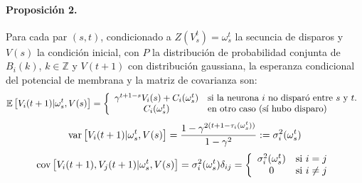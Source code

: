 \paragraph{Proposición 2.}
Para cada par $(s,t)$, condicionado a $Z(V_s^t)=\omega_s^t$ la secuncia de disparos y $V(s)$ la condición inicial, con $P$ la distribución de probabilidad conjunta de $B_i(k)$, $k \in \mathbb{Z}$ y $V(t+1)$ con distribución gaussiana, la esperanza condicional del potencial de membrana y la matriz de covarianza son:
\begin{equation}
    \mathbb{E} \left[V_i(t+1)|\omega_s^t, V(s)\right] = \left\{ \begin{array}{cl}
                        \gamma^{t+1-s} V_i(s) + C_i(\omega_s^t)   & \text{si la neurona $i$ no disparó entre $s$ y $t$.}\\ 
                         C_i(\omega_s^t)    & \text{en otro caso (sí hubo disparo)}
                    \end{array}\right.
    \label{eqn:espCond1}
\end{equation}
\begin{equation}
    \text{var}\left[V_i(t+1)|\omega_s^t, V(s)\right] = \frac{1-\gamma^{2(t+1-\tau_i(\omega_s^t))}}{1-\gamma^2} := \sigma_i^2(\omega_s^t)
    \label{eqn:varianzapot}
\end{equation}
\begin{equation}
    \text{cov}\left[V_i(t+1),V_j(t+1)|\omega_s^t, V(s)\right] = \sigma_i^2(\omega_s^t) \delta_{ij} = \left\{ \begin{array}{cl}
                        \sigma_i^2(\omega_s^t)   & \text{si } i=j\\ 
                         0    & \text{si } i\neq j
                    \end{array}\right.
\end{equation}

